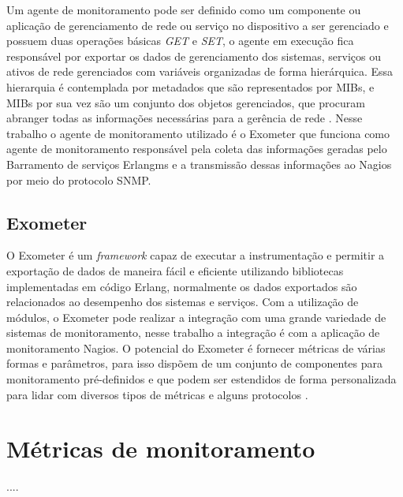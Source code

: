 Um agente de monitoramento pode ser definido como um componente ou aplicação de gerenciamento de rede ou serviço no dispositivo a ser gerenciado e possuem duas operações básicas \textit{GET} e \textit{SET}, o agente em execução fica responsável por exportar os dados de gerenciamento dos sistemas, serviços ou ativos de rede gerenciados com variáveis organizadas de forma hierárquica. Essa hierarquia é contemplada por metadados que são representados por \acrshort{MIBs}, e \acrshort{MIBs} por sua vez são um conjunto dos objetos gerenciados, que procuram abranger todas as informações necessárias para a gerência de rede \cite{6240708}. Nesse trabalho o agente de monitoramento utilizado é o Exometer que funciona como agente de monitoramento responsável pela coleta das informações geradas pelo Barramento de serviços Erlangms e a transmissão dessas informações ao Nagios por meio do protocolo \acrshort{SNMP}. 


\subsection{Exometer}

O Exometer é um \textit{framework} capaz de executar a instrumentação e permitir a exportação de dados de maneira fácil e eficiente utilizando bibliotecas implementadas em código Erlang, normalmente os dados exportados são relacionados ao desempenho dos sistemas e serviços. Com a utilização de módulos, o Exometer pode realizar a integração com uma grande variedade de sistemas de monitoramento, nesse trabalho a integração é com a aplicação de monitoramento Nagios. O potencial do Exometer é fornecer métricas de várias formas e parâmetros, para isso dispõem de um conjunto de componentes para monitoramento pré-definidos e que podem ser estendidos de forma personalizada para lidar com diversos tipos de métricas e alguns protocolos \cite{exometer_core}.


\section{Métricas de monitoramento}

....



